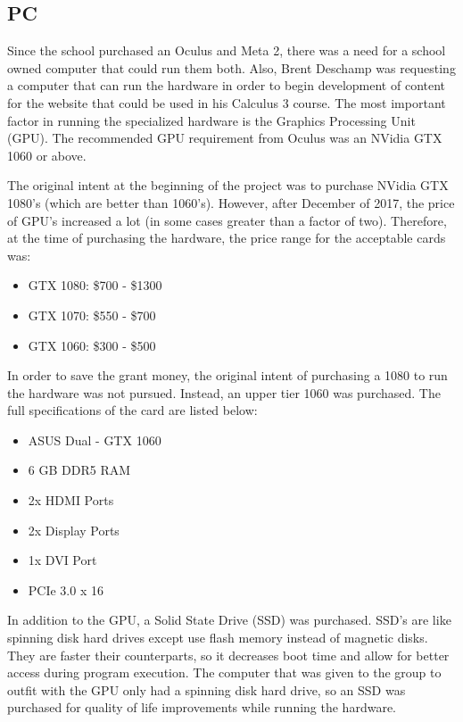 
\subsection{PC}

Since the school purchased an Oculus and Meta 2, there was a need for a school owned computer that could run them both.  Also, Brent Deschamp was requesting a computer that can run the hardware in order to begin development of content for the website that could be used in his Calculus 3 course.  The most important factor in running the specialized hardware is the Graphics Processing Unit (GPU).  The recommended GPU requirement from Oculus was an NVidia GTX 1060 or above.  

The original intent at the beginning of the project was to purchase NVidia GTX 1080's (which are better than 1060's).  However, after December of 2017, the price of GPU's increased a lot (in some cases greater than a factor of two).  Therefore, at the time of purchasing the hardware, the price range for the acceptable cards was:

\begin{itemize}
    \item GTX 1080: \$700 - \$1300
    \item GTX 1070: \$550 - \$700
    \item GTX 1060: \$300 - \$500 
\end{itemize}

In order to save the grant money, the original intent of purchasing a 1080 to run the hardware was not pursued.  Instead, an upper tier 1060 was purchased.  The full specifications of the card are listed below:

\begin{itemize}
    \item ASUS Dual - GTX 1060
    \item 6 GB DDR5 RAM
    \item 2x HDMI Ports
    \item 2x Display Ports
    \item 1x DVI Port
    \item PCIe 3.0 x 16
\end{itemize}

In addition to the GPU, a Solid State Drive (SSD) was purchased.  SSD's are like spinning disk hard drives except use flash memory instead of magnetic disks.  They are faster their counterparts, so it decreases boot time and allow for better access during program execution.  The computer that was given to the group to outfit with the GPU only had a spinning disk hard drive, so an SSD was purchased for quality of life improvements while running the hardware.

